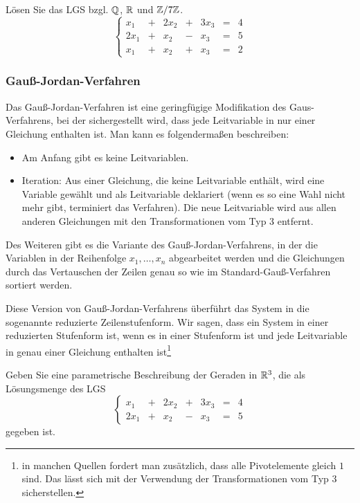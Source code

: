 \begin{bsp}
	Lösen Sie das LGS bzgl. $\mathbb Q$, $\mathbb R$ und $\mathbb Z / 7 \mathbb Z$. 
	\[
	\left\{
	\begin{array}{ccccccc}
		 x_1 &  +&  2 x_2 & + & 3 x_3 &  = & 4
\\		 2 x_1 & + & x_2 & -&  x_3 & =&  5
\\		 x_1 & + & x_2 & + & x_3 & = & 2
	\end{array}\right. 
	\]
\end{bsp} 

\subsubsection{Gauß-Jordan-Verfahren}

Das Gauß-Jordan-Verfahren ist eine geringfügige Modifikation des Gaus-Verfahrens, bei der sichergestellt wird, dass jede Leitvariable in nur einer Gleichung enthalten ist. Man kann es folgendermaßen beschreiben: 

\begin{framed}
\begin{itemize} 
	\item Am Anfang gibt es keine Leitvariablen. 
	\item Iteration: Aus einer Gleichung, die keine Leitvariable enthält, wird eine Variable gewählt und als Leitvariable deklariert (wenn es so eine Wahl nicht mehr gibt, terminiert das Verfahren). Die neue Leitvariable wird aus allen anderen Gleichungen mit den Transformationen vom Typ 3 entfernt. 
\end{itemize} 
\end{framed} 

Des Weiteren gibt es die Variante des Gauß-Jordan-Verfahrens, in der die Variablen in der Reihenfolge $x_1,\ldots,x_n$ abgearbeitet werden und die Gleichungen durch das Vertauschen der Zeilen genau so wie im Standard-Gauß-Verfahren sortiert werden. 

Diese Version von Gauß-Jordan-Verfahrens  überführt das System in die sogenannte reduzierte Zeilenstufenform. Wir sagen, dass ein System in einer reduzierten Stufenform ist, wenn es in einer Stufenform ist und jede Leitvariable in genau einer Gleichung enthalten ist\footnote{in manchen Quellen fordert man zusätzlich, dass alle Pivotelemente gleich $1$ sind. Das lässt sich mit der Verwendung der Transformationen vom Typ 3 sicherstellen.}

\begin{bsp}
	Geben Sie eine parametrische Beschreibung der Geraden in $\mathbb R^3$, die als Lösungsmenge des LGS
	\[
	\left\{
\begin{array}{ccccccc}
	x_1 &  +&  2 x_2 & + & 3 x_3 &  = & 4
	\\		 2 x_1 & + & x_2 & -&  x_3 & =&  5
\end{array}\right. 
	\]
	gegeben ist. 
\end{bsp} 

